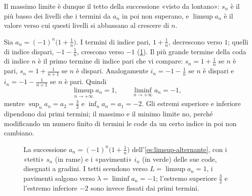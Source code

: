 Il massimo limite è dunque il tetto della successione «visto da lontano»: $s_{n}$ è il
più basso dei livelli che i termini da $a_{n}$ in poi non superano, e
$\limsup a_{n}$ è il valore verso cui questi livelli si abbassano al crescere di $n$.

\begin{esempio}\label{es:limsup-alternante}
Sia $a_{n}=(-1)^{n}\bigl(1+\frac1n\bigr)$. I termini di indice pari, $1+\frac1n$,
decrescono verso $1$; quelli di indice dispari, $-1-\frac1n$, crescono verso $-1$
(\cref{fig:limsup-code}). Il più grande termine della coda di indice $n$ è il primo
termine di indice pari che vi compare: $s_{n}=1+\frac1n$ se $n$ è pari,
$s_{n}=1+\frac1{n+1}$ se $n$ è dispari. Analogamente $i_{n}=-1-\frac1n$ se $n$ è dispari
e $i_{n}=-1-\frac1{n+1}$ se $n$ è pari. Quindi
\[
  \limsup_{n\to+\infty}a_{n}=1, \qquad \liminf_{n\to+\infty}a_{n}=-1,
\]
mentre $\sup_{n}a_{n}=a_{2}=\frac32$ e $\inf_{n}a_{n}=a_{1}=-2$. Gli estremi
superiore e inferiore dipendono dai primi termini; il massimo e il minimo limite no,
perché modificando un numero finito di termini le code da un certo indice in poi non
cambiano.
\end{esempio}

\begin{figure}[htb]
\centering
{}
\caption{La successione $a_{n}=(-1)^{n}\bigl(1+\frac1n\bigr)$
dell'\cref{es:limsup-alternante}, con i «tetti» $s_{n}$ (in rame) e i «pavimenti»
$i_{n}$ (in verde) delle sue code, disegnati a gradini. I tetti scendono verso
$L=\limsup a_{n}=1$, i pavimenti salgono verso $\lambda=\liminf a_{n}=-1$; l'estremo
superiore $\frac32$ e l'estremo inferiore $-2$ sono invece fissati dai primi termini.}
\label{fig:limsup-code}
\end{figure}

